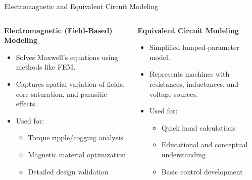 \begin{frame}{Electromagnetic and Equivalent Circuit Modeling}
    \begin{columns}
        \begin{column}{0.5\textwidth}
            \textbf{Electromagnetic (Field-Based) Modeling}
            \begin{itemize}
                \item Solves Maxwell’s equations using methods like FEM.
                \item Captures spatial variation of fields, core saturation, and parasitic effects.
                \item Used for:
                \begin{itemize}
                    \item Torque ripple/cogging analysis
                    \item Magnetic material optimization
                    \item Detailed design validation
                \end{itemize}
            \end{itemize}
        \end{column}
        \begin{column}{0.5\textwidth}
            \textbf{Equivalent Circuit Modeling}
            \begin{itemize}
                \item Simplified lumped-parameter model.
                \item Represents machines with resistances, inductances, and voltage sources.
                \item Used for:
                \begin{itemize}
                    \item Quick hand calculations
                    \item Educational and conceptual understanding
                    \item Basic control development
                \end{itemize}
            \end{itemize}
        \end{column}
    \end{columns}
\end{frame}


